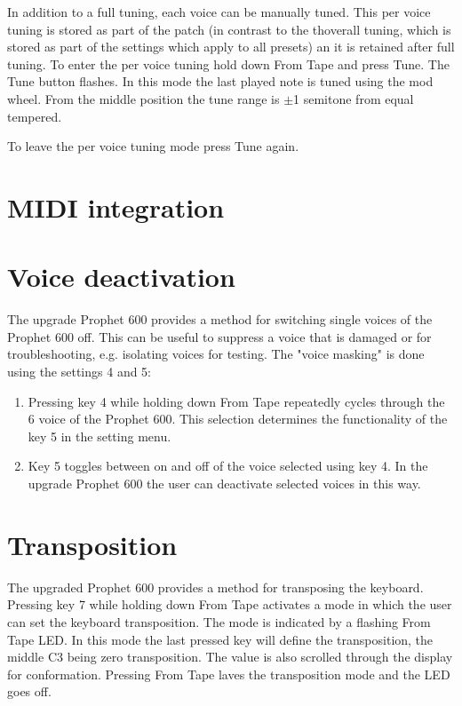 \documentclass[draft,landscape, 11pt, oneside]{report}
\newenvironment{flowtext}{\addmargin[0cm]{7cm}}{\endaddmargin} %
\begin{document}
\begin{flowtext}
In addition to a full tuning, each voice can be manually tuned. This per voice tuning is stored as part of the patch (in contrast to the thoverall tuning, which is stored as part of the settings which apply to all presets) an it is retained after full tuning. To enter the per voice tuning hold down From Tape and press Tune. The Tune button flashes. In this mode the last played note is tuned using the mod wheel. From the middle position the tune range is $\pm$1 semitone from equal tempered.

To leave the per voice tuning mode press Tune again.

\section{MIDI integration}\label{midiintegration.tex}



\section{Voice deactivation}

The upgrade Prophet 600 provides a method for switching single voices of the Prophet 600 off. This can be useful to suppress a voice that is damaged or for troubleshooting, e.g. isolating voices for testing. The "voice masking" is done using the settings 4 and 5:
\begin{enumerate}
  \setlength\itemsep{0cm}
  \item Pressing key 4 while holding down From Tape repeatedly cycles through the 6 voice of the Prophet 600. This selection determines the functionality of the key 5 in the setting menu.
  \item Key 5 toggles between on and off of the voice selected using key 4. In the upgrade Prophet 600 the user can deactivate selected voices in this way.
\end{enumerate}

\section{Transposition}

The upgraded Prophet 600 provides a method for transposing the keyboard. Pressing key 7 while holding down From Tape activates a mode in which the user can set the keyboard transposition. The mode is indicated by a flashing From Tape LED. In this mode the last pressed key will define the transposition, the middle C3 being zero transposition. The value is also scrolled through the display for conformation. Pressing From Tape laves the transposition mode and the LED goes off.


\end{flowtext}
\end{document}
